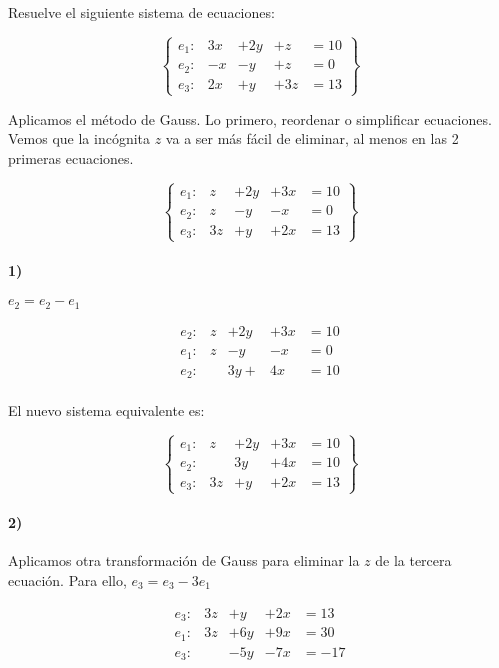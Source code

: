 \documentclass[palatino,nosec]{Docencia}
\begin{document}
\newpage
\begin{problem}
Resuelve el siguiente sistema de ecuaciones:

\[
\left\{\begin{array}{lllll}
e_1: & 3x &+ 2y &+z &=10\\
e_2: & -x&-y&+z&=0\\
e_3: & 2x&+y&+3z&=13
\end{array}\right\}
\]

\solution

Aplicamos el método de Gauss. Lo primero, reordenar o simplificar ecuaciones. Vemos que la incógnita $z$ va a ser más fácil de eliminar, al menos en las 2 primeras ecuaciones. 

\[
\left\{\begin{array}{lcccc}
e_1: & z &+ 2y &+3x &=10\\
e_2: & z&-y&-x&=0\\
e_3: & 3z&+y&+2x&=13
\end{array}\right\} 
\]

\paragraph{1)}
$e_2 = e_2-e_1$

\[
\begin{array}{lcccl}
e_2: & z &+ 2y &+3x &=10\\
e_1: & z&-y&-x&=0\\
\hline
e_2: & &3y+&4x&=10\\
\end{array}
\]	

El nuevo sistema equivalente es:

\[
\left\{\begin{array}{lccccc}
e_1: & z &+ 2y &+3x &=10\\
e_2: & &3y&+4x&=10\\
e_3: &3z&+y&+2x&=13
\end{array}\right\}
\]


\paragraph{2)} 

Aplicamos otra transformación de Gauss para eliminar la $z$ de la tercera ecuación. Para ello, $e_3 = e_3-3e_1$

\[
\begin{array}{lcccl}
e_3: & 3z&+y  &+2x&=13\\
e_1: & 3z&+6y &+9x&=30\\
\hline
e_3: &   &-5y &-7x&=-17\\
\end{array}
\]	


\end{problem}
\end{document}
